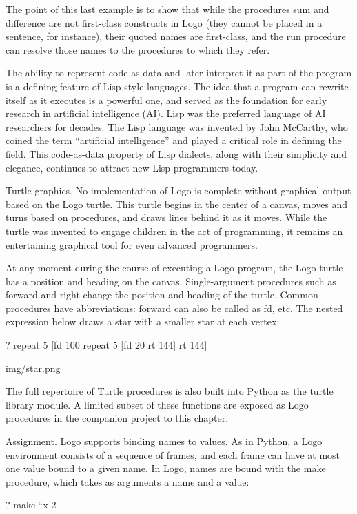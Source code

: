 \documentclass[letterpaper,10pt,dvipdfmx]{sphinxmanual}
\begin{document}
The point of this last example is to show that while the procedures sum and difference are not first-class constructs in Logo (they cannot be placed in a sentence, for instance), their quoted names are first-class, and the run procedure can resolve those names to the procedures to which they refer.

The ability to represent code as data and later interpret it as part of the program is a defining feature of Lisp-style languages. The idea that a program can rewrite itself as it executes is a powerful one, and served as the foundation for early research in artificial intelligence (AI). Lisp was the preferred language of AI researchers for decades. The Lisp language was invented by John McCarthy, who coined the term ``artificial intelligence'' and played a critical role in defining the field. This code-as-data property of Lisp dialects, along with their simplicity and elegance, continues to attract new Lisp programmers today.

Turtle graphics. No implementation of Logo is complete without graphical output based on the Logo turtle. This turtle begins in the center of a canvas, moves and turns based on procedures, and draws lines behind it as it moves. While the turtle was invented to engage children in the act of programming, it remains an entertaining graphical tool for even advanced programmers.

At any moment during the course of executing a Logo program, the Logo turtle has a position and heading on the canvas. Single-argument procedures such as forward and right change the position and heading of the turtle. Common procedures have abbreviations: forward can also be called as fd, etc. The nested expression below draws a star with a smaller star at each vertex:

? repeat 5 {[}fd 100 repeat 5 {[}fd 20 rt 144{]} rt 144{]}

img/star.png

The full repertoire of Turtle procedures is also built into Python as the turtle library module. A limited subset of these functions are exposed as Logo procedures in the companion project to this chapter.

Assignment. Logo supports binding names to values. As in Python, a Logo environment consists of a sequence of frames, and each frame can have at most one value bound to a given name. In Logo, names are bound with the make procedure, which takes as arguments a name and a value:

? make ``x 2
\end{document}
